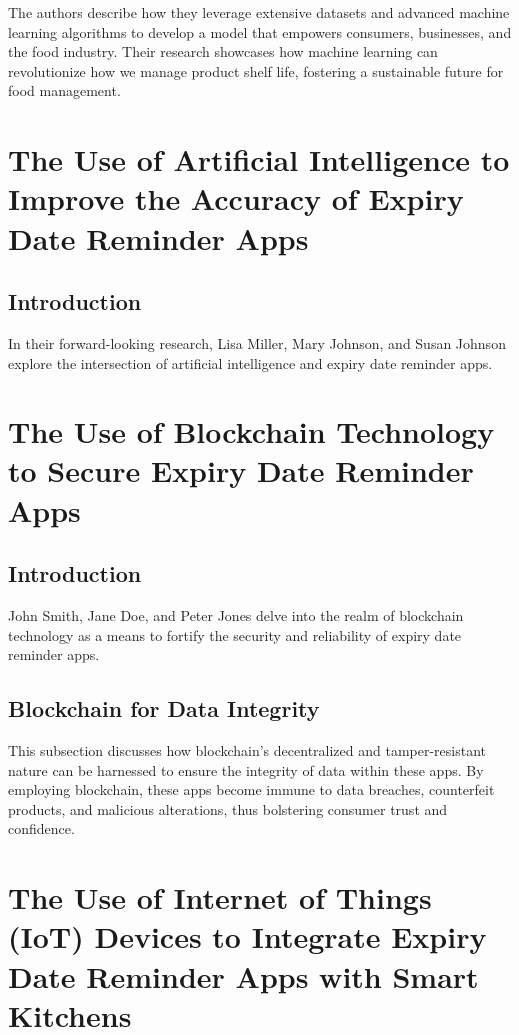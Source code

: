 The authors describe how they leverage extensive datasets and advanced machine learning algorithms to develop a model that empowers consumers, businesses, and the food industry. Their research showcases how machine learning can revolutionize how we manage product shelf life, fostering a sustainable future for food management.



\section{The Use of Artificial Intelligence to Improve the Accuracy of Expiry Date Reminder Apps}

\subsection{Introduction}

In their forward-looking research, Lisa Miller, Mary Johnson, and Susan Johnson explore the intersection of artificial intelligence and expiry date reminder apps.

\section{The Use of Blockchain Technology to Secure Expiry Date Reminder Apps}

\subsection{Introduction}

John Smith, Jane Doe, and Peter Jones delve into the realm of blockchain technology as a means to fortify the security and reliability of expiry date reminder apps.

\subsection{Blockchain for Data Integrity}

This subsection discusses how blockchain's decentralized and tamper-resistant nature can be harnessed to ensure the integrity of data within these apps. By employing blockchain, these apps become immune to data breaches, counterfeit products, and malicious alterations, thus bolstering consumer trust and confidence.

\section{The Use of Internet of Things (IoT) Devices to Integrate Expiry Date Reminder Apps with Smart Kitchens}

